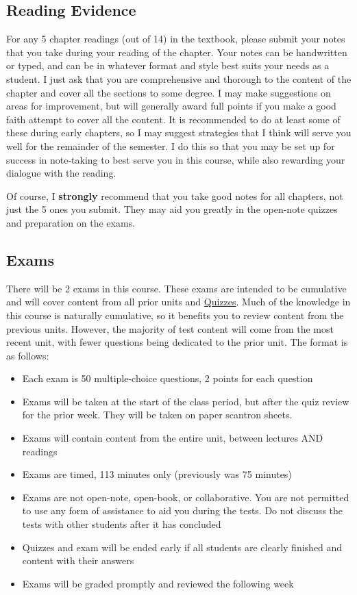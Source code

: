 \documentclass[
  12pt,
  letterpaper,
]{scrartcl}
\providecommand{\tightlist}{%
  \setlength{\itemsep}{0pt}\setlength{\parskip}{0pt}}\usepackage{longtable,booktabs,array}
\begin{document}
\subsection{Reading Evidence}\label{reading-evidence}

For any 5 chapter readings (out of 14) in the textbook, please submit
your notes that you take during your reading of the chapter. Your notes
can be handwritten or typed, and can be in whatever format and style
best suits your needs as a student. I just ask that you are
comprehensive and thorough to the content of the chapter and cover all
the sections to some degree. I may make suggestions on areas for
improvement, but will generally award full points if you make a good
faith attempt to cover all the content. It is recommended to do at least
some of these during early chapters, so I may suggest strategies that I
think will serve you well for the remainder of the semester. I do this
so that you may be set up for success in note-taking to best serve you
in this course, while also rewarding your dialogue with the reading.

Of course, I \textbf{strongly} recommend that you take good notes for
all chapters, not just the 5 ones you submit. They may aid you greatly
in the open-note quizzes and preparation on the exams.

\subsection{Exams}\label{exams}

There will be 2 exams in this course. These exams are intended to be
cumulative and will cover content from all prior units and
\hyperref[quizzes]{Quizzes}. Much of the knowledge in this course is
naturally cumulative, so it benefits you to review content from the
previous units. However, the majority of test content will come from the
most recent unit, with fewer questions being dedicated to the prior
unit. The format is as follows:

\begin{itemize}
\tightlist
\item
  Each exam is 50 multiple-choice questions, 2 points for each question
\item
  Exams will be taken at the start of the class period, but after the
  quiz review for the prior week. They will be taken on paper scantron
  sheets.
\item
  Exams will contain content from the entire unit, between lectures AND
  readings
\item
  Exams are timed, 113 minutes only (previously was 75 minutes)
\item
  Exams are not open-note, open-book, or collaborative. You are not
  permitted to use any form of assistance to aid you during the tests.
  Do not discuss the tests with other students after it has concluded
\item
  Quizzes and exam will be ended early if all students are clearly
  finished and content with their answers
\item
  Exams will be graded promptly and reviewed the following week
\end{itemize}
\end{document}
